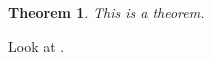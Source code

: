 \documentclass{amsart}
\newtheorem{theorem}{Theorem}
\begin{document}
\begin{theorem}
  \label{test}
  This is a theorem.
\end{theorem}

Look at .
\end{document}
